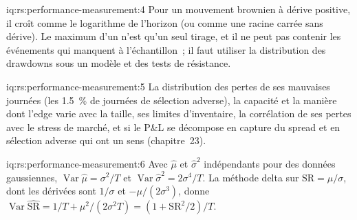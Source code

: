 \begin{solution}{iq:rs:performance-measurement:4}
Pour un mouvement brownien à dérive positive, il croît comme le logarithme de l'horizon (ou comme une racine carrée sans dérive). Le maximum d'un  n'est qu'un seul tirage, et
il ne peut pas contenir les événements qui manquent à l'échantillon~; il faut utiliser la distribution des drawdowns sous un modèle et des tests de résistance.
\end{solution}

\begin{solution}{iq:rs:performance-measurement:5}
La distribution des pertes de ses mauvaises journées (les 1.5~\% de journées de sélection adverse), la capacité et la manière dont l'edge varie avec la taille, ses limites d'inventaire, la corrélation de ses
pertes avec le stress de marché, et si le P\&L se décompose en capture du spread et en sélection adverse qui ont un sens (chapitre~23).
\end{solution}

\begin{solution}{iq:rs:performance-measurement:6}
Avec $\hat\mu$ et $\hat\sigma^2$ indépendants pour des données gaussiennes, $\operatorname{Var}\hat\mu = \sigma^2/T$ et $\operatorname{Var}\hat\sigma^2 = 2\sigma^4/T$. La
méthode delta sur $\mathrm{SR} = \mu/\sigma$, dont les dérivées sont $1/\sigma$ et $-\mu/(2\sigma^3)$, donne $\operatorname{Var}\widehat{\mathrm{SR}} = 1/T + \mu^2/(2\sigma^2 T) =
(1 + \mathrm{SR}^2/2)/T$.
\end{solution}
